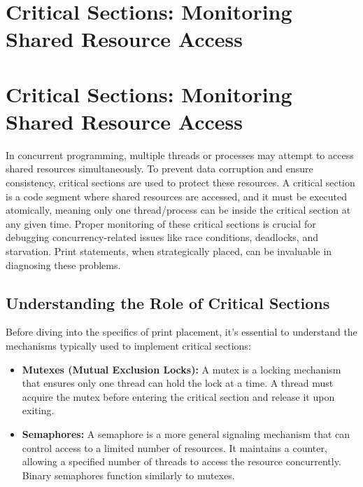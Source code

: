\documentclass{article}
\begin{document}
{{{%
\newpage

\section*{Critical Sections: Monitoring Shared Resource Access} %
\label{chapter-3-9-Critical_Sections__Monitoring_Shared_Res}

\section*{Critical Sections: Monitoring Shared Resource Access}

In concurrent programming, multiple threads or processes may attempt to access shared resources simultaneously. To prevent data corruption and ensure consistency, critical sections are used to protect these resources. A critical section is a code segment where shared resources are accessed, and it must be executed atomically, meaning only one thread/process can be inside the critical section at any given time. Proper monitoring of these critical sections is crucial for debugging concurrency-related issues like race conditions, deadlocks, and starvation. Print statements, when strategically placed, can be invaluable in diagnosing these problems.

\subsection*{Understanding the Role of Critical Sections}

Before diving into the specifics of print placement, it's essential to understand the mechanisms typically used to implement critical sections:

\begin{itemize}
    \item \textbf{Mutexes (Mutual Exclusion Locks):} A mutex is a locking mechanism that ensures only one thread can hold the lock at a time.  A thread must acquire the mutex before entering the critical section and release it upon exiting.

    \item \textbf{Semaphores:} A semaphore is a more general signaling mechanism that can control access to a limited number of resources.  It maintains a counter, allowing a specified number of threads to access the resource concurrently.  Binary semaphores function similarly to mutexes.


\end{itemize}}}}
\end{document}
